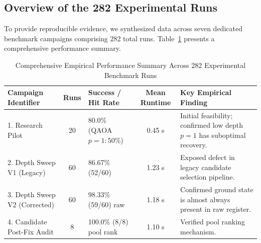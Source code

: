 \documentclass[11pt,a4paper]{article}
\theoremstyle{definition}
\theoremstyle{remark}
\begin{document}
\subsection{Overview of the 282 Experimental Runs}
To provide reproducible evidence, we synthesized data across seven dedicated benchmark campaigns comprising 282 total runs. Table~\ref{tab:performance_summary} presents a comprehensive performance summary.

\begin{table}[h]
\centering
\caption{Comprehensive Empirical Performance Summary Across 282 Experimental Benchmark Runs}
\label{tab:performance_summary}
\renewcommand{\arraystretch}{1.3}
\begin{tabular}{@{}p{3.5cm}cp{3.5cm}cp{4.5cm}@{}}
\toprule
\textbf{Campaign Identifier} & \textbf{Runs} & \textbf{Success / Hit Rate} & \textbf{Mean Runtime} & \textbf{Key Empirical Finding} \\ \midrule
1. Research Pilot & 20 & 80.0\% (QAOA $p=1: 50\%$) & 0.45 s & Initial feasibility; confirmed low depth $p=1$ has suboptimal recovery. \\ 
2. Depth Sweep V1 (Legacy) & 60 & 86.67\% (52/60) & 1.23 s & Exposed defect in legacy candidate selection pipeline. \\ 
3. Depth Sweep V2 (Corrected) & 60 & 98.33\% (59/60) raw & 1.18 s & Confirmed ground state is almost always present in raw register. \\ 
4. Candidate Post-Fix Audit & 8 & 100.0\% (8/8) pool rank & 1.10 s & Verified pool ranking mechanism. \\ \bottomrule
\end{tabular}
\end{table}
\end{document}

